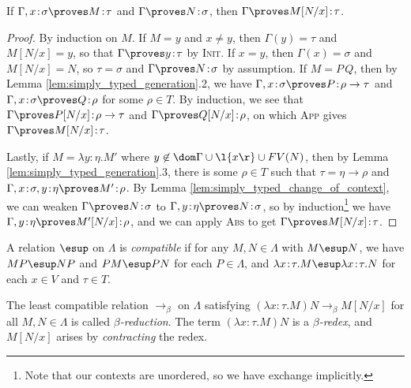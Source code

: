 \documentclass[reqno]{amsart}
\begin{document}
    \begin{lemma}\label{lem:simply_typed_substitution}
        If $\Gamma,x\!:\!\sigma\proves M\!:\!\tau$ and $\Gamma\proves N\!:\!\sigma$, then $\Gamma\proves M[N/x]\!:\!\tau$.
    \end{lemma}
    \begin{proof}
        By induction on $M$. If $M=y$ and $x\neq y$, then $\Gamma(y)=\tau$ and $M[N/x]=y$, so that $\Gamma\proves y\!:\!\tau$ by \textsc{Init}. If $x=y$, then $\Gamma(x)=\sigma$ and $M[N/x]=N$, so $\tau=\sigma$ and $\Gamma\proves N\!:\!\sigma$ by assumption. If $M=P\,Q$, then by Lemma \ref{lem:simply_typed_generation}.2, we have $\Gamma,x\!:\!\sigma\proves P\!:\!\rho\rightarrow\tau$ and $\Gamma,x\!:\!\sigma\proves Q\!:\!\rho$ for some $\rho\in T$. By induction, we see that $\Gamma\proves P[N/x]\!:\!\rho\to\tau$ and $\Gamma\proves Q[N/x]\!:\!\rho$, on which \textsc{App} gives $\Gamma\proves M[N/x]\!:\!\tau$.

        Lastly, if $M=\lambda y\!:\!\eta.M'$ where $y\not\in\dom\Gamma\cup\l\{x\r\}\cup FV(N)$, then by Lemma \ref{lem:simply_typed_generation}.3, there is some $\rho\in T$ such that $\tau=\eta\rightarrow\rho$ and $\Gamma,x\!:\!\sigma,y\!:\!\eta\proves M'\!:\!\rho$. By Lemma \ref{lem:simply_typed_change_of_context}, we can weaken $\Gamma\proves N\!:\!\sigma$ to $\Gamma,y\!:\!\eta\proves N\!:\!\sigma$, so by induction\footnote{Note that our contexts are unordered, so we have exchange implicitly.} we have $\Gamma,y\!:\!\eta\proves M'[N/x]\!:\!\rho$, and we can apply \textsc{Abs} to get $\Gamma\proves M[N/x]\!:\!\tau$.
    \end{proof}

    \begin{definition}
        A relation $\esup$ on $\Lambda$ is \textit{compatible} if for any $M,N\in\Lambda$ with $M\esup N$, we have $MP\esup NP$ and $PM\esup PN$ for each $P\in\Lambda$, and $\lambda x\!:\!\tau.M\esup\lambda x\!:\!\tau.N$ for each $x\in V$ and $\tau\in T$.
    \end{definition}

    \begin{definition}
        The least compatible relation $\rightarrow_\beta$ on $\Lambda$ satisfying $(\lambda x\!:\!\tau.M)N\rightarrow_\beta M[N/x]$ for all $M,N\in\Lambda$ is called \textit{$\beta$-reduction}. The term $(\lambda x\!:\!\tau.M)N$ is a \textit{$\beta$-redex}, and $M[N/x]$ arises by \textit{contracting} the redex.
    \end{definition}
\end{document}
